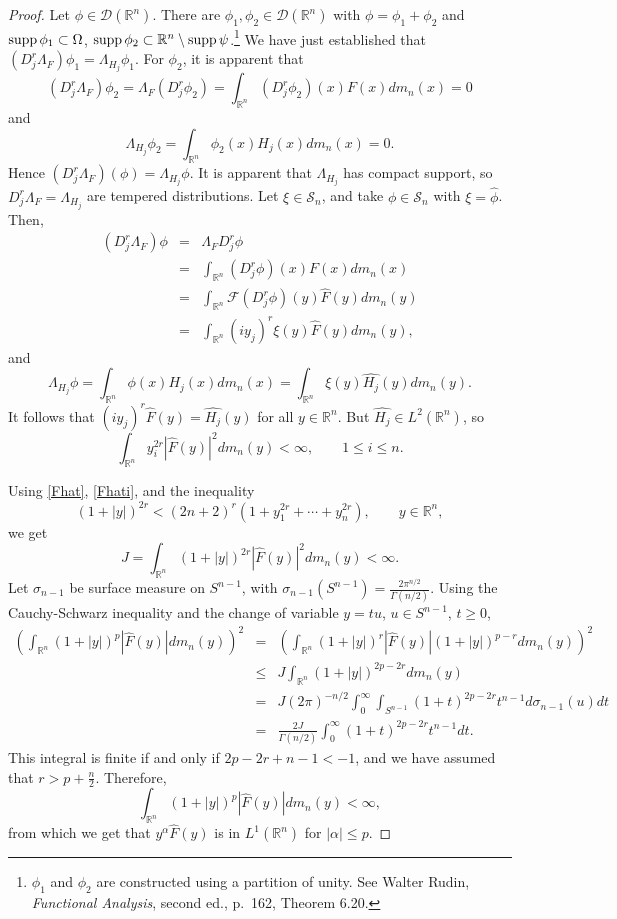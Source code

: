 \documentclass{article}
\newcommand{\supp}{\ensuremath\mathrm{supp}\,}
\theoremstyle{definition}
\begin{document}
\begin{proof}
Let $\phi \in \mathscr{D}(\mathbb{R}^n)$. There are $\phi_1,\phi_2 \in \mathscr{D}(\mathbb{R}^n)$ with $\phi=\phi_1+\phi_2$ and
$\supp \phi_1 \subset \Omega$, $\supp \phi_2 \subset \mathbb{R}^n \setminus \supp \psi$.\footnote{$\phi_1$ and $\phi_2$ are constructed
using a partition of unity. See
Walter Rudin, {\em Functional Analysis}, second ed., p.~162, Theorem 6.20.} We have just established that
$(D_j^r \Lambda_F)\phi_1=\Lambda_{H_j} \phi_1$. For $\phi_2$, it is apparent that
\[
(D_j^r \Lambda_F)\phi_2 = \Lambda_F(D_j^r \phi_2) = \int_{\mathbb{R}^n} (D_j^r \phi_2)(x) F(x) dm_n(x)=0
\]
and
\[
\Lambda_{H_j} \phi_2 = \int_{\mathbb{R}^n} \phi_2(x) H_j(x) dm_n(x) = 0.
\]
Hence $(D_j^r \Lambda_F)(\phi) = \Lambda_{H_j}\phi$. It is apparent that $\Lambda_{H_j}$ has compact support, 
so $D_j^r \Lambda_F = \Lambda_{H_j}$ are tempered distributions. Let $\xi \in \mathscr{S}_n$, and take $\phi \in \mathscr{S}_n$ with $\xi=\hat{\phi}$. Then,
\begin{eqnarray*}
(D_j^r \Lambda_F)  \phi&=&\Lambda_F D_j^r \phi\\
& =& \int_{\mathbb{R}^n} (D_j^r \phi)(x) F(x) dm_n(x)\\
&=&\int_{\mathbb{R}^n} \mathscr{F}(D_j^r \phi)(y) \widehat{F}(y) dm_n(y)\\
&=&\int_{\mathbb{R}^n} (iy_j)^r \xi(y) \widehat{F}(y) dm_n(y),
\end{eqnarray*}
and
\[
\Lambda_{H_j} \phi = \int_{\mathbb{R}^n} \phi(x) H_j(x) dm_n(x) = \int_{\mathbb{R}^n} \xi(y) \widehat{H_j}(y) dm_n(y).
\]
It follows that  $(iy_j)^r\widehat{F}(y)= \widehat{H_j}(y)$ for all $y \in \mathbb{R}^n$. But $\widehat{H_j} \in L^2(\mathbb{R}^n)$, so
\begin{equation}
\int_{\mathbb{R}^n} y_i^{2r} |\widehat{F}(y)|^2 dm_n(y)< \infty, \qquad 1 \leq i \leq n.
\label{Fhati}
\end{equation}

Using \eqref{Fhat}, \eqref{Fhati}, and the inequality
\[
(1+|y|)^{2r} < (2n+2)^r(1+y_1^{2r} + \cdots + y_n^{2r}), \qquad y \in \mathbb{R}^n,
\]
we get
\[
J = \int_{\mathbb{R}^n} (1+|y|)^{2r} |\widehat{F}(y)|^2 dm_n(y)<\infty.
\]
Let $\sigma_{n-1}$ be surface measure on $S^{n-1}$, with  $\sigma_{n-1}(S^{n-1})=\frac{2\pi^{n/2}}{\Gamma(n/2)}$. 
Using the Cauchy-Schwarz inequality and the change of variable $y=tu$, $u \in S^{n-1}$, $t \geq 0$,
\begin{eqnarray*}
\left( \int_{\mathbb{R}^n} (1+|y|)^p |\widehat{F}(y)| dm_n(y)\right)^2 & =&\left( \int_{\mathbb{R}^n} (1+|y|)^r |\widehat{F}(y)| (1+|y|)^{p-r} dm_n(y)\right)^2\\
&\leq&J  \int_{\mathbb{R}^n} (1+|y|)^{2p-2r} dm_n(y)\\
&=&J(2\pi)^{-n/2} \int_{0}^\infty \int_{S^{n-1}} (1+t)^{2p-2r} t^{n-1} d\sigma_{n-1}(u) dt\\
&=&\frac{2J}{\Gamma(n/2)} \int_{0}^\infty (1+t)^{2p-2r} t^{n-1} dt.
\end{eqnarray*}
This integral is finite if and only if $2p-2r+n-1<-1$, and we have assumed that $r>p+\frac{n}{2}$.
Therefore,
\[
 \int_{\mathbb{R}^n} (1+|y|)^p |\widehat{F}(y)| dm_n(y)< \infty,
\]
from which we get that $y^\alpha \widehat{F}(y)$ is in $L^1(\mathbb{R}^n)$ for $|\alpha| \leq p$.


\end{proof}
\end{document}
